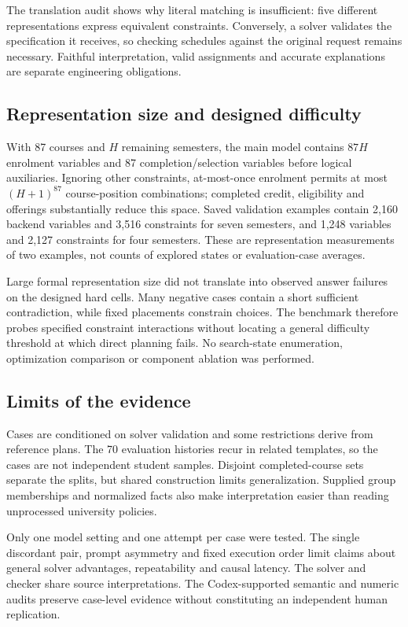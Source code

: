 \documentclass[11pt,a4paper]{article}
\begin{document}
The translation audit shows why literal matching is insufficient:
five different representations express equivalent constraints. Conversely,
a solver validates the specification it receives, so checking schedules
against the original request remains necessary. Faithful interpretation,
valid assignments and accurate explanations are separate engineering obligations.

\subsection{Representation size and designed difficulty}
With 87 courses and $H$ remaining semesters, the main model contains $87H$
enrolment variables and 87 completion/selection variables before logical
auxiliaries. Ignoring other constraints, at-most-once enrolment permits at
most $(H+1)^{87}$ course-position combinations; completed credit, eligibility
and offerings substantially reduce this space. Saved validation examples
contain 2,160 backend variables and 3,516 constraints for seven semesters,
and 1,248 variables and 2,127 constraints for four semesters. These are
representation measurements of two examples, not counts of explored states
or evaluation-case averages.

Large formal representation size did not translate into observed answer
failures on the designed hard cells. Many negative cases contain a short
sufficient contradiction, while fixed placements constrain choices.
The benchmark therefore probes specified constraint interactions without
locating a general difficulty threshold at which direct planning fails.
No search-state enumeration, optimization comparison or component ablation
was performed.

\subsection{Limits of the evidence}
Cases are conditioned on solver validation and some restrictions derive
from reference plans. The 70 evaluation histories recur in related templates,
so the cases are not independent student samples. Disjoint completed-course
sets separate the splits, but shared construction limits generalization.
Supplied group memberships and normalized facts also make interpretation
easier than reading unprocessed university policies.

Only one model setting and one attempt per case were tested. The single
discordant pair, prompt asymmetry and fixed execution order limit claims
about general solver advantages, repeatability and causal latency.
The solver and checker share source interpretations. The Codex-supported
semantic and numeric audits preserve case-level evidence without constituting
an independent human replication.
\end{document}
